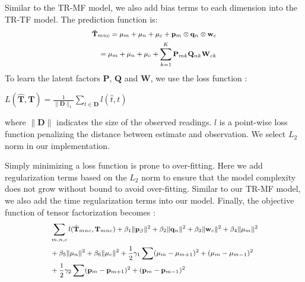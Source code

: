Similar to the TR-MF model, we also add bias terms to each dimension into the TR-TF model. The prediction function is:
\begin{equation*}
\small
\begin{aligned}
\mathbf{\hat{T}}_{mnc}=\mu_m+\mu_n+\mu_c + \mathbf{p}_m \otimes \mathbf{q}_n\otimes \mathbf{w}_c
\\=\mu_m+\mu_n+\mu_c+\sum\limits_{k=1}^{K}\mathbf{P}_{m k} \mathbf{Q}_{n k} \mathbf{W}_{c k}
\end{aligned}
\end{equation*}
To learn the latent factors $\mathbf{P}$, $\mathbf{Q}$ and $\mathbf{W}$, we use the loss function :
\begin{center}
$L(\mathbf{\hat{T}},\mathbf{T})=\frac{1}{\|\mathbf{D}\|_1} \sum\limits_{t\in \mathbf{D}}  l(\hat{t},t)$
\end{center}
where $\|\mathbf{D}\|$ indicates the size of the observed readings.
$l$ is a point-wise loss function penalizing the distance between estimate and observation.
We select $L_2$ norm in our implementation.

Simply minimizing a loss function is prone to over-fitting. Here we add regularization terms based on the $L_2$ norm to ensure that the model complexity does not grow without bound to avoid over-fitting.
Similar to our TR-MF model, we also add the time regularization terms into our model.
Finally, the objective function of tensor factorization becomes :\\
\begin{equation*}
\small
\begin{aligned}
&\sum\limits_{m, n, c} l( \hat{\mathbf{T}}_{mnc}, \mathbf{T}_{mnc} )+\beta_1\|\mathbf{p}_{\beta}\|^2+\beta_2\|\mathbf{q}_n\|^2+\beta_3\|\mathbf{w}_c\|^2+\beta_4\|\mu_m\|^2\\
&+\beta_5\|\mu_n\|^2+\beta_6\|\mu_c\|^2+\frac{1}{2}\gamma_1\sum(\mu_m-\mu_{m+1})^2+(\mu_m-\mu_{m-1})^2
\\&
+\frac{1}{2}\gamma_2\sum(\mathbf{p}_m-\mathbf{p}_{m+1})^2+(\mathbf{p}_m-\mathbf{p}_{m-1})^2
\end{aligned}
\end{equation*}

